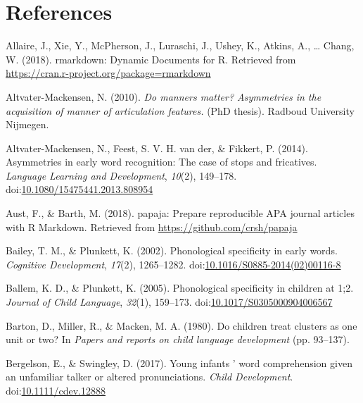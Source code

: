 \documentclass[man]{apa6}
\begin{document}
\newpage

\hypertarget{references}{%
\section{References}\label{references}}

\begingroup
\setlength{\parindent}{-0.5in}
\setlength{\leftskip}{0.5in}

\hypertarget{refs}{}
\leavevmode\hypertarget{ref-RMarkdown}{}%
Allaire, J., Xie, Y., McPherson, J., Luraschi, J., Ushey, K., Atkins, A., \ldots{} Chang, W. (2018). rmarkdown: Dynamic Documents for R. Retrieved from \url{https://cran.r-project.org/package=rmarkdown}

\leavevmode\hypertarget{ref-Altvater2010}{}%
Altvater-Mackensen, N. (2010). \emph{Do manners matter? Asymmetries in the acquisition of manner of articulation features.} (PhD thesis). Radboud University Nijmegen.

\leavevmode\hypertarget{ref-Altvater2014}{}%
Altvater-Mackensen, N., Feest, S. V. H. van der, \& Fikkert, P. (2014). Asymmetries in early word recognition: The case of stops and fricatives. \emph{Language Learning and Development}, \emph{10}(2), 149--178. doi:\href{https://doi.org/10.1080/15475441.2013.808954}{10.1080/15475441.2013.808954}

\leavevmode\hypertarget{ref-papaja}{}%
Aust, F., \& Barth, M. (2018). papaja: Prepare reproducible APA journal articles with R Markdown. Retrieved from \url{https://github.com/crsh/papaja}

\leavevmode\hypertarget{ref-Bailey2002}{}%
Bailey, T. M., \& Plunkett, K. (2002). Phonological specificity in early words. \emph{Cognitive Development}, \emph{17}(2), 1265--1282. doi:\href{https://doi.org/10.1016/S0885-2014(02)00116-8}{10.1016/S0885-2014(02)00116-8}

\leavevmode\hypertarget{ref-Ballem2005}{}%
Ballem, K. D., \& Plunkett, K. (2005). Phonological specificity in children at 1;2. \emph{Journal of Child Language}, \emph{32}(1), 159--173. doi:\href{https://doi.org/10.1017/S0305000904006567}{10.1017/S0305000904006567}

\leavevmode\hypertarget{ref-Barton1980}{}%
Barton, D., Miller, R., \& Macken, M. A. (1980). Do children treat clusters as one unit or two? In \emph{Papers and reports on child language development} (pp. 93--137).

\leavevmode\hypertarget{ref-Bergelson2017}{}%
Bergelson, E., \& Swingley, D. (2017). Young infants ' word comprehension given an unfamiliar talker or altered pronunciations. \emph{Child Development}. doi:\href{https://doi.org/10.1111/cdev.12888}{10.1111/cdev.12888}
\end{document}
